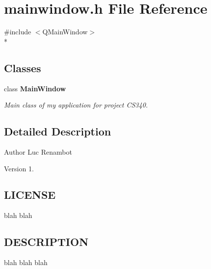 \section{mainwindow.\-h File Reference}
\label{mainwindow_8h}
{\ttfamily \#include $<$Q\-Main\-Window$>$}\\*
\subsection*{Classes}
\begin{DoxyCompactItemize}
\item 
class {\bf Main\-Window}
\begin{DoxyCompactList}\small\item\em Main class of my application for project C\-S340. \end{DoxyCompactList}\end{DoxyCompactItemize}


\subsection{Detailed Description}
\begin{DoxyAuthor}{Author}
Luc Renambot 
\end{DoxyAuthor}
\begin{DoxyVersion}{Version}
1. 
\end{DoxyVersion}
\subsection{L\-I\-C\-E\-N\-S\-E}\label{mainwindow_8h_LICENSE}
blah blah \subsection{D\-E\-S\-C\-R\-I\-P\-T\-I\-O\-N}\label{mainwindow_8h_DESCRIPTION}
blah blah blah 